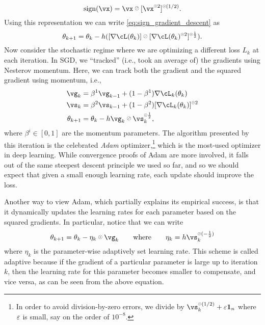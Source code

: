 \documentclass[../../book-main.tex]{subfiles}
\begin{document}
\begin{equation}
    \sign(\vx) = \vx \haddiv [\vx^{\hada 2}]^{\hada (1/2)}.
\end{equation}
Using this representation we can write \eqref{eq:sign_gradient_descent} as 
\begin{equation}
    \theta_{k + 1} = \theta_{k} - h ([\nabla \cL(\theta_{k})] \haddiv [\nabla
    \cL(\theta_{k})^{\hada 2}]^{\hada \frac{1}{2}}).
\end{equation}
Now consider the stochastic regime where we are optimizing a different loss \(L_{k}\) at each iteration. In SGD, we ``tracked'' (i.e., took an average of) the gradients using Nesterov momentum. Here, we can track both the gradient and the squared gradient using momentum, i.e.,
\begin{align}
    \vg_{k}
    &= \beta^{1}\vg_{k - 1} + (1 - \beta^{1})\nabla \cL_{k}(\theta_{k}) \\ 
    \vs_{k}
    &= \beta^{2}\vs_{k - 1} + (1 - \beta^{2})[\nabla \cL_{k}(\theta_{k})]^{\hada 2}  \\
    \theta_{k + 1}
    &= \theta_{k} - h\vg_{k}\haddiv\vs_{k}^{\hada \frac{1}{2}},
\end{align}
where \(\beta^{i} \in [0, 1]\) are the momentum parameters. The algorithm
presented by this iteration is the celebrated \textit{Adam}
optimizer,\footnote{In order to avoid division-by-zero errors, we divide by
\(\vs_{k}^{\hada (1/2)} + \eps \vone_{n}\) where \(\varepsilon\) is small, say on the order of \(10^{-8}\).} which is the most-used optimizer in deep learning. While convergence proofs of Adam are more involved, it falls out of the same steepest descent principle we used so far, and so we should expect that given a small enough learning rate, each update should improve the loss.

Another way to view Adam, which partially explains its empirical success, is that it dynamically updates the learning rates for each parameter based on the squared gradients. In particular, notice that we can write
\begin{equation}
    \theta_{k + 1} = \theta_{k} - \eta_{k} \hada \vg_{k} \qquad \text{where}
    \qquad \eta_{k} = h \vs_{k}^{\hada (-\frac{1}{2})}
\end{equation}
where \(\eta_{k}\) is the parameter-wise adaptively set learning rate. This scheme is called adaptive because if the gradient of a particular parameter is large up to iteration \(k\), then the learning rate for this parameter becomes smaller to compensate, and vice versa, as can be seen from the above equation.
\end{document}
